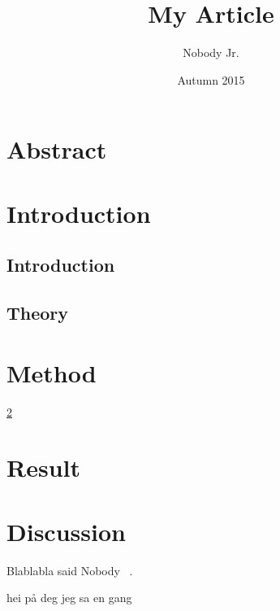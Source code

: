 \documentclass[11pt]{article}
\begin{document}
\begin{titlepage}

\title{My Article}
\author{Nobody Jr.}
\date{Autumn 2015}
\maketitle

\newpage
\end{titlepage}

\pagestyle{plain}
\setcounter{page}{1}

\section{Abstract} %
\label{sec:abstract}


\newpage

\tableofcontents

\newpage

\setcounter{page}{1}  


\section{Introduction} 
\label{sec:introduction}

\subsection{Introduction} %
\label{sub:introduction}



\subsection{Theory} %
\label{sub:theory}






\section{Method} %
\label{sec:method}


\ref{sec:introduction} 



\section{Result} %
\label{sec:result}


\section{Discussion} %
\label{sec:discussion}





Blablabla said Nobody ~\cite{Nobody06}.

hei på deg jeg sa en gang ~\cite{mrx05}

{}

\end{document}
